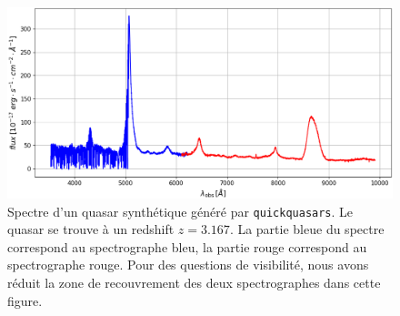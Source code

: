 \begin{figure}
  \centering
  \includegraphics[scale=0.42]{quickquasars_spectrum}
  \caption{Spectre d'un quasar synthétique généré par \texttt{quickquasars}. Le quasar se trouve à un redshift $z = \num{3.167}$. La partie bleue du spectre correspond au spectrographe bleu, la partie rouge correspond au spectrographe rouge. Pour des questions de visibilité, nous avons réduit la zone de recouvrement des deux spectrographes dans cette figure.}
  \label{fig:quickquasars_spectrum}
\end{figure}

